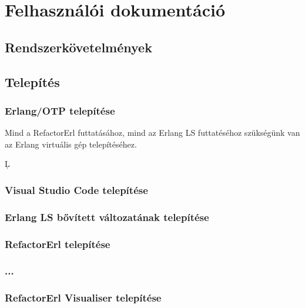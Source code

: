 \chapter{Felhasználói dokumentáció}
\label{ch:user}

\section{Rendszerkövetelmények}
\section{Telepítés}
\subsection{Erlang/OTP telepítése}

Mind a RefactorErl futtatásához, mind az Erlang LS futtatéséhoz szükségünk van az Erlang virtuális gép 
telepítéséhez. 

Ļ

\subsection{Visual Studio Code telepítése}
\subsection{Erlang LS bővített változatának telepítése}
\subsection{RefactorErl telepítése}
\subsection{...}
\subsection{RefactorErl Visualiser telepítése}

\subsection{}